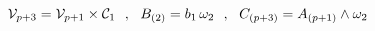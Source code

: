 \begin{equation}
{\cal V}_{p+3} = {\cal V}_{p+1} \times {\cal C}_1~~,~~ B_{(2)} = b_1
\,\omega_2~~,~~C_{(p+3)} = A_{(p+1)} \wedge \omega_2
\label{wra98}
\end{equation}

